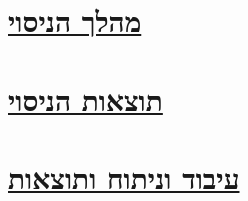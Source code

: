 \documentclass[a4paper, 12pt]{article}
\begin{document}
    \pagebreak 

    \section{\underline{מהלך הניסוי}}
    \begin{spacing}{1.15}
        \begin{flushright}

        \end{flushright}
    \end{spacing}

    \pagebreak 

    \section{\underline{תוצאות הניסוי}}
    \begin{spacing}{1.15}
        \begin{flushright}

        \end{flushright}
    \end{spacing}

    \pagebreak 

    \section{\underline{עיבוד וניתוח ותוצאות}}
    \begin{spacing}{1.15}
        \begin{flushright}

        \end{flushright}
    \end{spacing}
\end{document}
